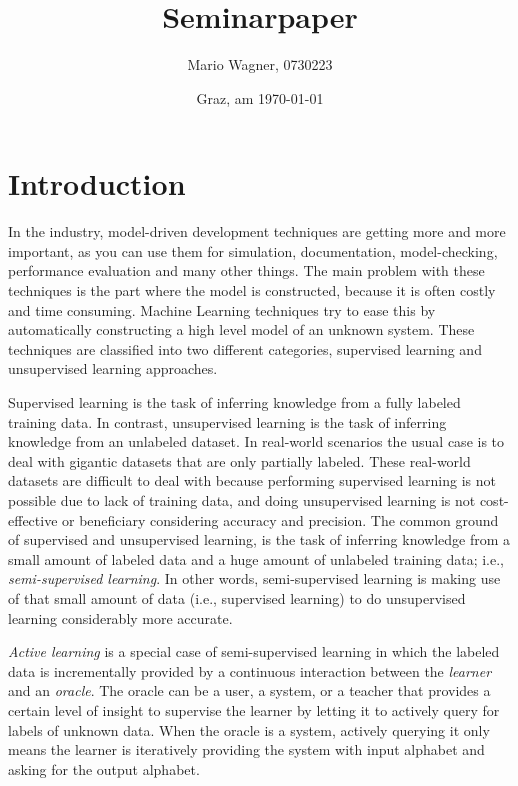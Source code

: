 \documentclass[
a4paper,
12pt
]{scrartcl}
\title{Seminarpaper}
\author{Mario Wagner, 0730223}
\date{Graz, am \today{}}
\begin{document}
 \maketitle
 \tableofcontents
 \listoffigures
 \listoftables

\newpage


\section{Introduction}
In the industry, model-driven development techniques are getting more and more important, as you can use them for simulation, documentation, model-checking, performance evaluation and many other things. The main problem with these techniques is the part where the model is constructed, because it is often costly and time consuming. Machine Learning techniques try to ease this by automatically constructing a high level model of an unknown system. These techniques are classified into two different categories, supervised learning and unsupervised learning approaches.

\par Supervised learning is the task of inferring knowledge from a fully labeled training data. In contrast, unsupervised learning is the task of inferring knowledge from an unlabeled dataset. In real-world scenarios the usual case is to deal with gigantic datasets that are only partially labeled. These real-world datasets are difficult to deal with because performing supervised learning is not possible due to lack of training data, and doing unsupervised learning is not cost-effective or beneficiary considering accuracy and precision. The common ground of supervised and unsupervised learning, is the task of inferring knowledge from a small amount of labeled data and a huge amount of unlabeled training data; i.e., \emph{semi-supervised learning}. In other words, semi-supervised learning is making use of that small amount of data (i.e., supervised learning) to do unsupervised learning considerably more accurate.

\par \emph{Active learning} is a special case of semi-supervised learning in which the labeled data is incrementally provided by a continuous interaction between the \emph{learner} and an \emph{oracle}. The oracle can be a user, a system, or a teacher that provides a certain level of insight to supervise the learner by letting it to actively query for labels of unknown data. When the oracle is a system, actively querying it only means the learner is iteratively providing the system with input alphabet and asking for the output alphabet.
\end{document}
